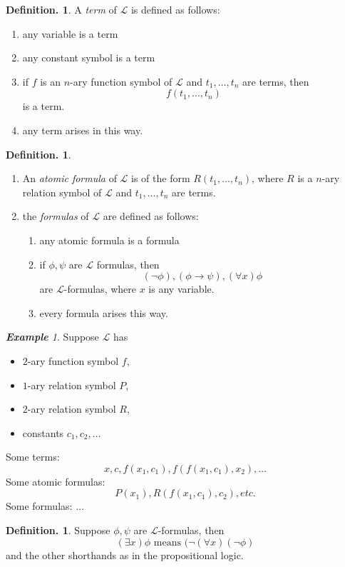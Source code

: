 \documentclass[a4paper,oneside,11pt,DIV=12,parskip=half]{scrartcl}
\newcommand{\LL}{\mathcal L}
\theoremstyle{plain}
\theoremstyle{definition}
\newtheorem{definition}[theorem]{Definition.}
\newtheorem{remark, definition}[theorem]{Remark and Definition.}
\newtheorem{lemma, definition}[theorem]{Lemma and Definition.}
\newtheorem{theorem, definition}[theorem]{Theorem and Definition.}
\theoremstyle{remark}
\newtheorem*{example}{\textbf{Example}}
\newtheorem*{remark, example}{\textbf{Remark and Exercise}}
\begin{document}
\begin{definition}
    A \emph{term} of $\mathcal{L}$ is defined as follows:
    \begin{enumerate}
        \item any variable is a term
        \item any constant symbol is a term
        \item if $f$ is an $n$-ary function symbol of $\mathcal{L}$ and $t_1,\dots,t_n$ are terms, then
        \[ f(t_1,\dots,t_n) \] is a term.
        \item any term arises in this way.
    \end{enumerate}
\end{definition}

\begin{definition}
\begin{enumerate}
    \item An \emph{atomic formula} of $\LL$ is of the form $ R(t_1,\dots,t_n) $, where $R$ is a $n$-ary relation symbol of $\LL$ and $t_1,\dots,t_n$ are terms.
    \item the \emph{formulas} of $\LL$ are defined as follows:
    \begin{enumerate}
        \item any atomic formula is a formula
        \item if $\phi,\psi$ are $\LL$ formulas, then 
        \[ (\lnot \phi), (\phi \rightarrow \psi), (\forall x) \phi \]
        are $\LL$-formulas, where $x$ is any variable.
        \item every formula arises this way.
    \end{enumerate}
\end{enumerate}
\end{definition}
\begin{example}
Suppose $\LL$ has 
\begin{itemize}
    \item $2$-ary function symbol $f$,
    \item $1$-ary relation symbol $P$,
    \item $2$-ary relation symbol $R$,
    \item constants $c_1,c_2,\dots$
\end{itemize}
Some terms: 
\[ x,c,f(x_1,c_1) ,f(f(x_1,c_1),x_2), \dots \]
Some atomic formulas:
\[ P(x_1),R(f(x_1,c_1),c_2), etc. \]
Some formulas:
$\dots$
\end{example}


\begin{definition}
Suppose $\phi,\psi$ are $\LL$-formulas, then
\[ (\exists x) \phi \text{ means } (\lnot (\forall x) (\lnot \phi) \]
and the other shorthands as in the propositional logic.
\end{definition}
\end{document}
